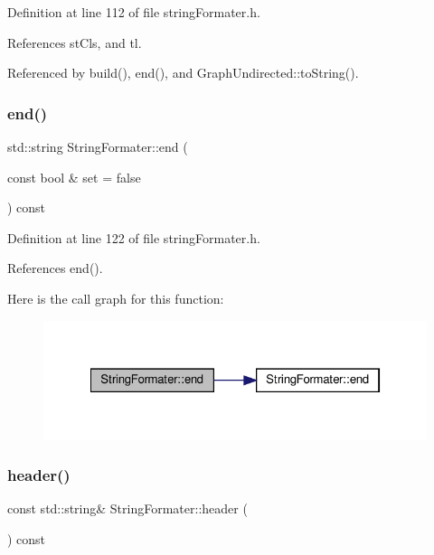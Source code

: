 Definition at line 112 of file string\+Formater.\+h.



References st\+Cls, and tl.



Referenced by build(), end(), and Graph\+Undirected\+::to\+String().

\mbox{\label{classStringFormater_aae2d087c138d5bcf6bdb917f5a681ef3}} 
\subsubsection{\texorpdfstring{end()}{end()}\hspace{0.1cm}{\footnotesize\ttfamily [2/2]}}
{\footnotesize\ttfamily std\+::string String\+Formater\+::end (\begin{DoxyParamCaption}\item[{const bool \&}]{set = {\ttfamily false} }\end{DoxyParamCaption}) const\hspace{0.3cm}{\ttfamily [inline]}}



Definition at line 122 of file string\+Formater.\+h.



References end().

Here is the call graph for this function\+:
\nopagebreak
\begin{figure}[H]
\begin{center}
\leavevmode
\includegraphics[width=322pt]{classStringFormater_aae2d087c138d5bcf6bdb917f5a681ef3_cgraph}
\end{center}
\end{figure}
\mbox{\label{classStringFormater_adebd3114b32c2aa5d1ebc1737a56ca5d}} 
\subsubsection{\texorpdfstring{header()}{header()}\hspace{0.1cm}{\footnotesize\ttfamily [1/2]}}
{\footnotesize\ttfamily const std\+::string\& String\+Formater\+::header (\begin{DoxyParamCaption}{ }\end{DoxyParamCaption}) const\hspace{0.3cm}{\ttfamily [inline]}}



